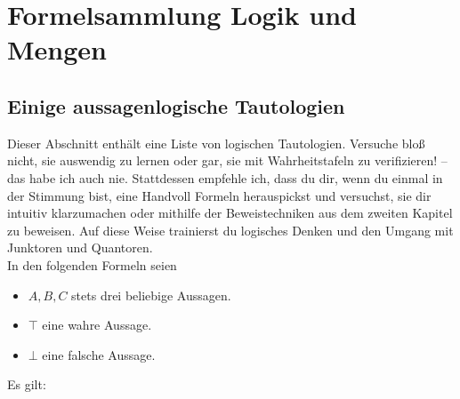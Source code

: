 

\chapter{Formelsammlung Logik und Mengen} \label{formelsammlung}


\section{Einige aussagenlogische Tautologien}
Dieser Abschnitt enthält eine Liste von logischen Tautologien. Versuche bloß nicht, sie auswendig zu lernen oder gar, sie mit Wahrheitstafeln zu verifizieren! -- das habe ich auch nie. Stattdessen empfehle ich, dass du dir, wenn du einmal in der Stimmung bist, eine Handvoll Formeln herauspickst und versuchst, sie dir intuitiv klarzumachen oder mithilfe der Beweistechniken aus dem zweiten Kapitel zu beweisen. Auf diese Weise trainierst du logisches Denken und den Umgang mit Junktoren und Quantoren. \\[0.5em]
In den folgenden Formeln seien
\begin{itemize}
    \item $A,B,C$ stets drei beliebige Aussagen.
    \item $\top$ eine wahre Aussage.
    \item $\bot$ eine falsche Aussage.
\end{itemize}
Es gilt:
\begingroup
\allowdisplaybreaks
